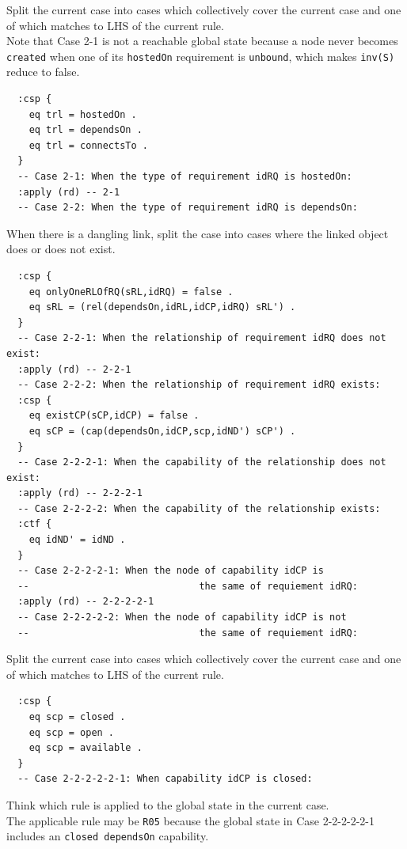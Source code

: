 \documentclass[12pt]{report}
\newcommand{\stt}[1]{{\small{\tt {#1}}}}
\begin{document}
 Split the current case into cases which
collectively cover the current case and one of which matches to LHS of
the current rule. \\ 
Note that Case 2-1 is not a reachable global state because a node never
becomes {\tt created} when one of its {\tt hostedOn} requirement is
{\tt unbound}, which makes \stt{inv(S)} reduce to false.
\small
\begin{verbatim}
  :csp {
    eq trl = hostedOn .
    eq trl = dependsOn .
    eq trl = connectsTo .
  }
  -- Case 2-1: When the type of requirement idRQ is hostedOn:
  :apply (rd) -- 2-1
  -- Case 2-2: When the type of requirement idRQ is dependsOn:
\end{verbatim}
\normalsize
 When there is a dangling link, split the case
into cases where the linked object does or does not exist.
\small
\begin{verbatim}
  :csp {
    eq onlyOneRLOfRQ(sRL,idRQ) = false .
    eq sRL = (rel(dependsOn,idRL,idCP,idRQ) sRL') .
  }
  -- Case 2-2-1: When the relationship of requirement idRQ does not exist:
  :apply (rd) -- 2-2-1
  -- Case 2-2-2: When the relationship of requirement idRQ exists:
  :csp {
    eq existCP(sCP,idCP) = false .
    eq sCP = (cap(dependsOn,idCP,scp,idND') sCP') .
  }
  -- Case 2-2-2-1: When the capability of the relationship does not exist:
  :apply (rd) -- 2-2-2-1
  -- Case 2-2-2-2: When the capability of the relationship exists:
  :ctf {
    eq idND' = idND .
  }
  -- Case 2-2-2-2-1: When the node of capability idCP is
  --                              the same of requiement idRQ:
  :apply (rd) -- 2-2-2-2-1
  -- Case 2-2-2-2-2: When the node of capability idCP is not
  --                              the same of requiement idRQ:
\end{verbatim}
\normalsize
 Split the current case into cases which
collectively cover the current case and one of which matches to LHS of
the current rule. 
\small
\begin{verbatim}
  :csp {
    eq scp = closed .
    eq scp = open .
    eq scp = available .
  }
  -- Case 2-2-2-2-2-1: When capability idCP is closed:
\end{verbatim}
\normalsize
 Think which rule is applied to the 
global state in the current case. \\
The applicable rule may be {\tt R05} because the global state in Case
2-2-2-2-2-1 includes an {\tt closed dependsOn} capability.\\
\end{document}
